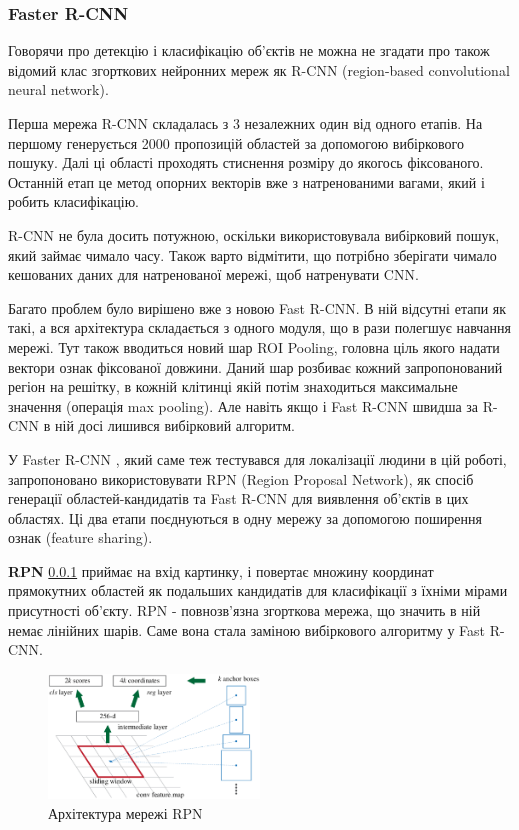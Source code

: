 \subsubsection{Faster R-CNN}

Говорячи про детекцію і класифікацію об'єктів не можна не згадати про також відомий
клас згорткових нейронних мереж як R-CNN (region-based convolutional neural network).

Перша мережа R-CNN складалась з 3 незалежних один від одного етапів.
На першому генерується 2000 пропозицій областей за допомогою
вибіркового пошуку. Далі ці області проходять стиснення розміру до якогось
фіксованого. Останній етап це метод опорних векторів вже з натренованими 
вагами, який і робить класифікацію.

R-CNN не була досить потужною, оскільки використовувала вибірковий пошук, 
який займає чимало часу. Також варто відмітити, що потрібно зберігати чимало
кешованих даних для натренованої мережі, щоб натренувати CNN.

Багато проблем було вирішено вже з новою Fast R-CNN. В ній відсутні етапи як такі,
а вся архітектура складається з одного модуля, що в рази полегшує
навчання мережі. Тут також вводиться новий шар ROI Pooling, головна ціль якого 
надати вектори ознак фіксованої довжини. Даний шар розбиває кожний запропонований 
регіон на решітку, в кожній клітинці якій потім знаходиться максимальне значення
(операція max pooling). Але навіть якщо і  Fast R-CNN швидша за R-CNN в ній досі 
лишився вибірковий алгоритм.

У Faster R-CNN \cite{faster_rcnn}, який саме теж тестувався для локалізації людини в
цій роботі, запропоновано використовувати RPN (Region Proposal Network), як спосіб 
генерації областей-кандидатів та Fast R-CNN для виявлення об'єктів в цих областях.
Ці два етапи поєднуються в одну мережу за допомогою поширення ознак (feature sharing).


\textbf{RPN} \ref{} приймає на вхід картинку, і повертає множину координат прямокутних областей як подальших
кандидатів для класифікації з їхніми мірами присутності об'єкту. RPN - повнозв'язна 
згорткова мережа, що значить в ній немає лінійних шарів. Саме вона стала заміною
вибіркового алгоритму у Fast R-CNN. 

\begin{figure}[H]
    \centering
    \includegraphics[width=0.5\textwidth]{images/cnn_faster_rcnn_rpn}
    \caption{Архітектура мережі RPN \cite{faster_rcnn}
        \label{fig:cnn:faster_rcnn_rpn}
    }
\end{figure}

